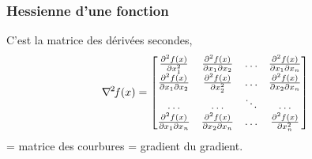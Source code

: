 \documentclass[12pt]{beamer}
\begin{document}
\begin{frame}
\frametitle{Hessienne d'une fonction} 
C’est la matrice des dérivées secondes,
\begin{equation*}
\nabla^{{\mkern-1mu}2}{\mkern-2mu}{f}(x) = 
\begin{bmatrix}
\frac{\partial^2 f(x)}{\partial x_1^2} & \frac{\partial^2 f(x)}{\partial x_1 \partial x_2} & \ldots & \frac{\partial^2 f(x)}{\partial x_1 \partial x_n}\\ 
\frac{\partial^2 f(x)}{\partial x_1 \partial x_2} & \frac{\partial^2 f(x)}{\partial x_2^2} & \ldots & \frac{\partial^2 f(x)}{\partial x_2 \partial x_n}\\
\ldots & \ldots & \ddots & \ldots \\
\frac{\partial^2 f(x)}{\partial x_1 \partial x_n} & \frac{\partial^2 f(x)}{\partial x_2 \partial x_n} & \ldots & \frac{\partial^2 f(x)}{\partial x_n^2}
\end{bmatrix}
\end{equation*}
= matrice des courbures = gradient du gradient.
\end{frame}
\end{document}
